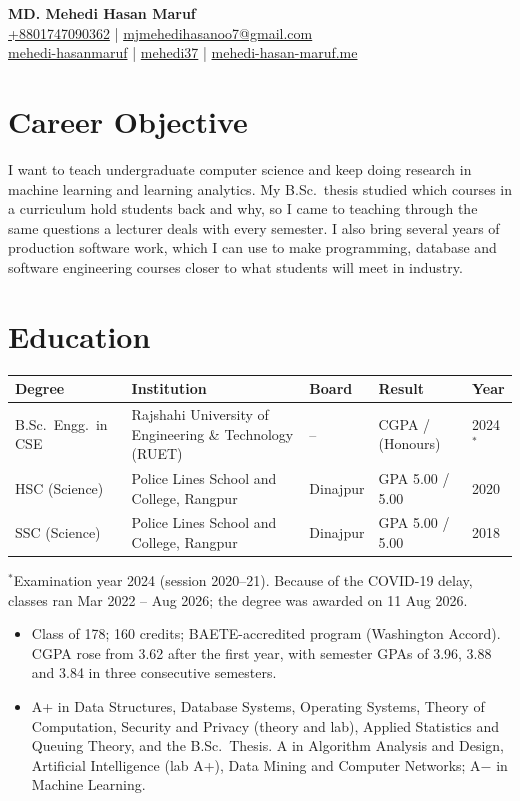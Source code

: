 \documentclass[10pt, a4paper]{article}
\newcommand{\resitem}[1]{\item #1}
\newcommand{\header}[6]{
  \begin{center}
    {\Huge\bfseries\color{primary} #1}\\[0.5em] %
    \small %
    \faPhone* \href{tel:#2}{#2} \quad | \quad
    \faEnvelope \href{mailto:#3}{\hspace{0.5mm}#3} \\
    \faLinkedin \href{#4}{\hspace{0.5mm}mehedi-hasanmaruf} \quad | \quad
    \faGithub \href{#5}{\hspace{0.5mm}mehedi37} \quad | \quad
    \faGlobe \href{#6}{\hspace{0.5mm}mehedi-hasan-maruf.me}
  \end{center}
}
\begin{document}
\color{primary}

\header{MD. Mehedi Hasan Maruf}
       {+8801747090362}
       {mjmehedihasanoo7@gmail.com}
       {https://www.linkedin.com/in/mehedi-hasanmaruf}
       {https://github.com/mehedi37}
       {https://www.mehedi-hasan-maruf.me/}

\section{Career Objective}
I want to teach undergraduate computer science and keep doing research in machine learning and learning analytics. My B.Sc.\ thesis studied which courses in a curriculum hold students back and why, so I came to teaching through the same questions a lecturer deals with every semester. I also bring several years of production software work, which I can use to make programming, database and software engineering courses closer to what students will meet in industry.

\section{Education}
\renewcommand{\arraystretch}{1.25}
\begin{tabularx}{\textwidth}{@{}l X l l l@{}}
\toprule
\textbf{Degree} & \textbf{Institution} & \textbf{Board} & \textbf{Result} & \textbf{Year} \\
\midrule
B.Sc.\ Engg.\ in CSE & Rajshahi University of Engineering \& Technology (RUET) & -- & CGPA \factEduCgpa{} / \factEduScale{} (Honours) & 2024$^{*}$ \\
HSC (Science) & Police Lines School and College, Rangpur & Dinajpur & GPA 5.00 / 5.00 & 2020 \\
SSC (Science) & Police Lines School and College, Rangpur & Dinajpur & GPA 5.00 / 5.00 & 2018 \\
\bottomrule
\end{tabularx}

{\small $^{*}$Examination year 2024 (session 2020--21). Because of the COVID-19 delay, classes ran Mar 2022 -- Aug 2026; the degree was awarded on 11 Aug 2026.}

\begin{itemize}
    \resitem{Class of 178; 160 credits; BAETE-accredited program (Washington Accord). CGPA rose from 3.62 after the first year, with semester GPAs of 3.96, 3.88 and 3.84 in three consecutive semesters.}
    \resitem{A+ in Data Structures, Database Systems, Operating Systems, Theory of Computation, Security and Privacy (theory and lab), Applied Statistics and Queuing Theory, and the B.Sc.\ Thesis. A in Algorithm Analysis and Design, Artificial Intelligence (lab A+), Data Mining and Computer Networks; A$-$ in Machine Learning.}
\end{itemize}
\end{document}
